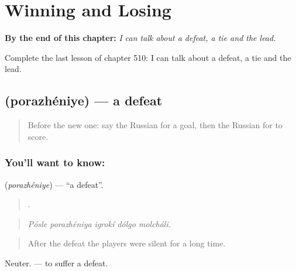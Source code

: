 
\chapter{Winning and Losing}
\label{ch:ru-winning-and-losing}

\begin{chapteropening}
\textbf{By the end of this chapter:} \emph{I can talk about a defeat, a tie and the lead.}

Complete the last lesson of chapter 510: I can talk about a defeat, a tie and the lead.
\end{chapteropening}

\section[\texorpdfstring{\ru{поражение} (porazhéniye)}{поражение (porazhéniye)}]{ (porazhéniye) — a defeat}

\label{lesson:RU-C510-porazheniye}



\begin{quote}
Before the new one: say the Russian for a goal, then the Russian for to score.
\end{quote}

\subsection*{You'll want to know: }
\textbf{} (\emph{porazhéniye}) — \textquotedblleft{}a defeat\textquotedblright{}.

\begin{quote}
    .
\end{quote}

\begin{quote}
\emph{Pósle porazhéniya igrokí dólgo molcháli.}
\end{quote}

\begin{quote}
After the defeat the players were silent for a long time.
\end{quote}

Neuter. \emph{ } — to suffer a defeat.

